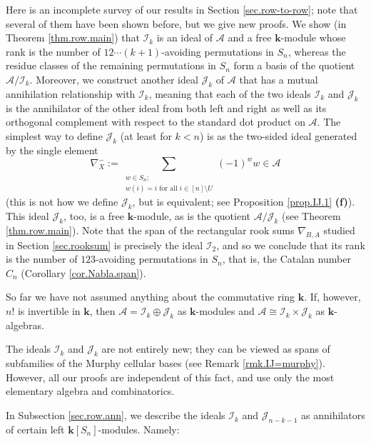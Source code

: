 \documentclass[numbers=enddot,12pt,final,onecolumn,notitlepage]{scrartcl}%
\numberwithin{exer}{subsection}
\theoremstyle{definition}
\let\sumnonlimits\sum
\renewcommand{\sum}{\sumnonlimits\limits}
\begin{document}
Here is an incomplete survey of our results in Section \ref{sec.row-to-row};
note that several of them have been shown before, but we give new proofs. We
show (in Theorem \ref{thm.row.main}) that $\mathcal{I}_{k}$ is an ideal of
$\mathcal{A}$ and a free $\mathbf{k}$-module whose rank is the number of
$12\cdots\left(  k+1\right)  $-avoiding permutations in $S_{n}$, whereas the
residue classes of the remaining permutations in $S_{n}$ form a basis of the
quotient $\mathcal{A}/\mathcal{I}_{k}$. Moreover, we construct another ideal
$\mathcal{J}_{k}$ of $\mathcal{A}$ that has a mutual annihilation relationship
with $\mathcal{I}_{k}$, meaning that each of the two ideals $\mathcal{I}_{k}$
and $\mathcal{J}_{k}$ is the annihilator of the other ideal from both left and
right as well as its orthogonal complement with respect to the standard dot
product on $\mathcal{A}$. The simplest way to define $\mathcal{J}_{k}$ (at
least for $k<n$) is as the two-sided ideal generated by the single element
\[
\nabla_{X}^{-}:=\sum_{\substack{w\in S_{n};\\w\left(  i\right)  =i\text{ for
all }i\in\left[  n\right]  \setminus U}}\left(  -1\right)  ^{w}w\in\mathcal{A}%
\]
(this is not how we define $\mathcal{J}_{k}$, but is equivalent; see
Proposition \ref{prop.IJ.1} \textbf{(f)}). This ideal $\mathcal{J}_{k}$, too,
is a free $\mathbf{k}$-module, as is the quotient $\mathcal{A}/\mathcal{J}%
_{k}$ (see Theorem \ref{thm.row.main}). Note that the span of the rectangular
rook sums $\nabla_{B,A}$ studied in Section \ref{sec.rooksum} is precisely the
ideal $\mathcal{I}_{2}$, and so we conclude that its rank is the number of
$123$-avoiding permutations in $S_{n}$, that is, the Catalan number $C_{n}$
(Corollary \ref{cor.Nabla.span}).

So far we have not assumed anything about the commutative ring $\mathbf{k}$.
If, however, $n!$ is invertible in $\mathbf{k}$, then $\mathcal{A}%
=\mathcal{I}_{k}\oplus\mathcal{J}_{k}$ as $\mathbf{k}$-modules and
$\mathcal{A}\cong\mathcal{I}_{k}\times\mathcal{J}_{k}$ as $\mathbf{k}$-algebras.

The ideals $\mathcal{I}_{k}$ and $\mathcal{J}_{k}$ are not entirely new; they
can be viewed as spans of subfamilies of the Murphy cellular bases (see Remark
\ref{rmk.IJ=murphy}). However, all our proofs are independent of this fact,
and use only the most elementary algebra and combinatorics.

In Subsection \ref{sec.row.ann}, we describe the ideals $\mathcal{I}_{k}$ and
$\mathcal{J}_{n-k-1}$ as annihilators of certain left $\mathbf{k}\left[
S_{n}\right]  $-modules. Namely:
\end{document}
